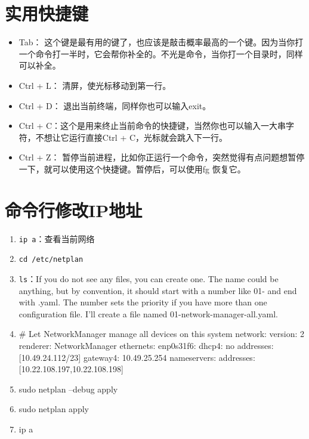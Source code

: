 \section{实用快捷键}
\begin{itemize}
\item
Tab： 这个键是最有用的键了，也应该是敲击概率最高的一个键。因为当你打一个命令打一半时，它会帮你补全的。不光是命令，当你打一个目录时，同样可以补全。
\item
Ctrl + L： 清屏，使光标移动到第一行。
\item
Ctrl + D： 退出当前终端，同样你也可以输入exit。
\item
Ctrl + C：这个是用来终止当前命令的快捷键，当然你也可以输入一大串字符，不想让它运行直接Ctrl + C，光标就会跳入下一行。 
\item
Ctrl + Z： 暂停当前进程，比如你正运行一个命令，突然觉得有点问题想暂停一下，就可以使用这个快捷键。暂停后，可以使用fg 恢复它。
\end{itemize}



\section{命令行修改IP地址}
\begin{enumerate}
\item \verb|ip a|：查看当前网络

\item \verb|cd /etc/netplan|

\item \verb|ls|：If you do not see any files, you can create one. The name could be anything, but by convention, it should start with a number like 01- and end with .yaml. The number sets the priority if you have more than one configuration file.
I'll create a file named 01-network-manager-all.yaml.

\item 
\# Let NetworkManager manage all devices on this system
network:
  version: 2
  renderer: NetworkManager
  ethernets:
    enp0s31f6:
      dhcp4: no
      addresses: [10.49.24.112/23]
      gateway4: 10.49.25.254
      nameservers:
        addresses: [10.22.108.197,10.22.108.198]

\item sudo netplan --debug apply

\item sudo netplan apply

\item ip a
\end{enumerate}



